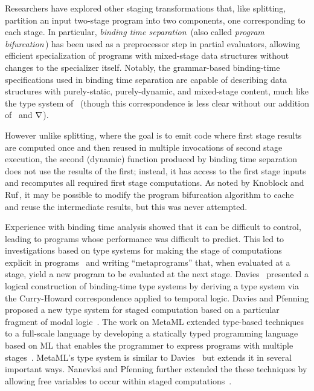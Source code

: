 Researchers have explored other staging transformations that, 
like splitting, partition an input two-stage program into two components,
one corresponding to each stage.  
In particular, \emph{binding time separation}\,\cite{Mogensen89a} 
(also called \emph{program bifurcation}\,\cite{DeNiel91})
has been used as a preprocessor step in partial evaluators,
allowing efficient specialization of programs with 
mixed-stage data structures without changes to the specializer itself.
Notably, the grammar-based binding-time specifications used in binding 
time separation are capable of describing
data structures with purely-static, purely-dynamic, and mixed-stage
content, much like the type system of \lang\
(though this correspondence is less clear without our addition of 
\bbonep\ and $\nabla$).

However unlike splitting, where the goal is to emit code where first stage results
are computed once and then reused in multiple invocations of second
stage execution, the second (dynamic) function produced by binding time separation
does not use the results of the first; instead,
it has access to the first stage inputs and recomputes all required
first stage computations. As noted by Knoblock and
Ruf\,\cite{knoblock96}, it may be possible to modify the program
bifurcation algorithm to cache and reuse the intermediate results, but
this was never attempted.

Experience with binding time analysis showed that it can be difficult
to control, leading to programs whose performance was difficult to
predict. This led to investigations based on type systems for making
the stage of computations explicit in
programs~\cite{GJ91-lambda,NN92-twolevel} and writing ``metaprograms''
that, when evaluated at a stage, yield a new program to be evaluated
at the next stage.  Davies~\cite{davies96} presented a logical
construction of binding-time type systems by deriving a type system
via the Curry-Howard correspondence applied to temporal logic.  Davies
and Pfenning proposed a new type system for staged computation based
on a particular fragment of modal logic~\cite{DP01-modal}. The work on
MetaML extended type-based techniques to a full-scale language by
developing a statically typed programming language based on ML that
enables the programmer to express programs with multiple
stages~\cite{Taha97,taha-thesis-99}.  MetaML's type system is similar
to Davies~\cite{davies96} but extends it in several important ways.
Nanevksi and Pfenning further extended the these techniques by
allowing free variables to occur within staged
computations~\cite{NP05-nn}.

